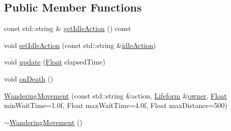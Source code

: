 \subsection*{Public Member Functions}
\begin{DoxyCompactItemize}
\item 
const std\+::string \& \hyperlink{classZeta_1_1WanderingMovement_ad92f415528c1f7e8fc967229362435da}{get\+Idle\+Action} () const 
\item 
void \hyperlink{classZeta_1_1WanderingMovement_a75ab74025e791ba8a0db8a59a1e8a054}{set\+Idle\+Action} (const std\+::string \&\hyperlink{classZeta_1_1WanderingMovement_a210f9adaeff521f33dd201fcaf741586}{idle\+Action})
\item 
void \hyperlink{classZeta_1_1WanderingMovement_a15a7e60d70d4e37fc53f151be29d9bef}{update} (\hyperlink{namespaceZeta_a1e0a1265f9b3bd3075fb0fabd39088ba}{Float} elapsed\+Time)
\item 
void \hyperlink{classZeta_1_1WanderingMovement_a1940a0d9b48694a37c4cd022646c3af1}{on\+Death} ()
\item 
\hyperlink{classZeta_1_1WanderingMovement_adc5111b62fe398b9f261cfc0bcc520f0}{Wandering\+Movement} (const std\+::string \&action, \hyperlink{classZeta_1_1Lifeform}{Lifeform} \&\hyperlink{classZeta_1_1Behaviour_ad32d56994e4e09e01ef86bcbb5c85e0a}{owner}, \hyperlink{namespaceZeta_a1e0a1265f9b3bd3075fb0fabd39088ba}{Float} min\+Wait\+Time=1.\+0f, Float max\+Wait\+Time=4.\+0f, Float max\+Distance=500)
\item 
\hyperlink{classZeta_1_1WanderingMovement_a8353fffff2e5e4325bb0f5463d507db7}{$\sim$\+Wandering\+Movement} ()
\end{DoxyCompactItemize}
